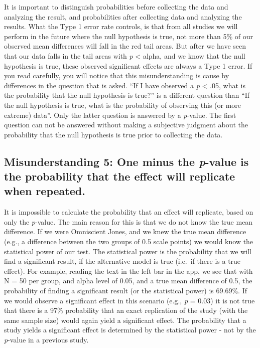 \documentclass[
  oneside]{book}
\begin{document}
It is important to distinguish probabilities before collecting the data and analyzing the result, and probabilities after collecting data and analyzing the results. What the Type 1 error rate controls, is that from all studies we will perform in the future where the null hypothesis is true, not more than 5\% of our observed mean differences will fall in the red tail areas. But after we have seen that our data falls in the tail areas with \emph{p} \textless{} alpha, and we know that the null hypothesis is true, these observed significant effects are always a Type 1 error. If you read carefully, you will notice that this misunderstanding is cause by differences in the question that is asked. ``If I have observed a \emph{p} \textless{} .05, what is the probability that the null hypothesis is true?'' is a different question than ``If the null hypothesis is true, what is the probability of observing this (or more extreme) data''. Only the latter question is answered by a \emph{p}-value. The first question can not be answered without making a subjective judgment about the probability that the null hypothesis is true prior to collecting the data.

\hypertarget{misunderstanding-5-one-minus-the-p-value-is-the-probability-that-the-effect-will-replicate-when-repeated.}{%
\subsection{\texorpdfstring{Misunderstanding 5: One minus the \emph{p}-value is the probability that the effect will replicate when repeated.}{Misunderstanding 5: One minus the p-value is the probability that the effect will replicate when repeated.}}\label{misunderstanding-5-one-minus-the-p-value-is-the-probability-that-the-effect-will-replicate-when-repeated.}}

It is impossible to calculate the probability that an effect will replicate, based on only the \emph{p}-value. The main reason for this is that we do not know the true mean difference. If we were Omniscient Jones, and we knew the true mean difference (e.g., a difference between the two groups of 0.5 scale points) we would know the statistical power of our test. The statistical power is the probability that we will find a significant result, if the alternative model is true (i.e.~if there is a true effect). For example, reading the text in the left bar in the app, we see that with N = 50 per group, and alpha level of 0.05, and a true mean difference of 0.5, the probability of finding a significant result (or the statistical power) is 69.69\%. If we would observe a significant effect in this scenario (e.g., \emph{p} = 0.03) it is not true that there is a 97\% probability that an exact replication of the study (with the same sample size) would again yield a significant effect. The probability that a study yields a significant effect is determined by the statistical power - not by the \emph{p}-value in a previous study.
\end{document}
